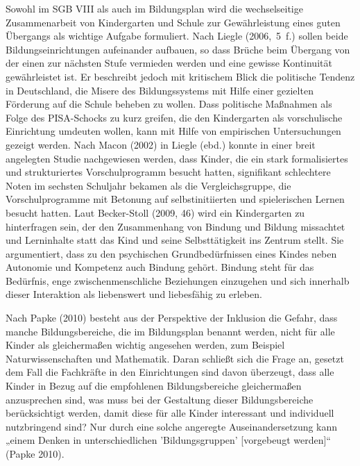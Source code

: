 Sowohl im SGB VIII als auch im Bildungsplan wird die wechselseitige Zusammenarbeit von Kindergarten und Schule zur Gewährleistung eines guten Übergangs als wichtige Aufgabe formuliert. Nach Liegle (2006,~5~f.) sollen beide Bildungseinrichtungen aufeinander aufbauen, so dass Brüche beim Übergang von der einen zur nächsten Stufe vermieden werden und eine gewisse Kontinuität gewährleistet ist. Er beschreibt jedoch mit kritischem Blick die politische Tendenz in Deutschland, die Misere des Bildungssystems mit Hilfe einer gezielten Förderung auf die Schule beheben zu wollen.
Dass politische Maßnahmen als Folge des PISA-Schocks zu kurz greifen, die den Kindergarten als vorschulische Einrichtung umdeuten wollen, kann mit Hilfe von empirischen Untersuchungen gezeigt werden. Nach  Macon (2002) in Liegle (ebd.) konnte in einer breit angelegten Studie nachgewiesen werden, dass Kinder, die ein stark formalisiertes und strukturiertes Vorschulprogramm besucht hatten, signifikant schlechtere Noten im sechsten Schuljahr bekamen als die Vergleichsgruppe, die Vorschulprogramme mit Betonung auf selbstinitiierten und spielerischen Lernen besucht hatten. 
Laut Becker-Stoll (2009, 46) wird ein Kindergarten zu hinterfragen sein, der den Zusammenhang von Bindung und Bildung missachtet und Lerninhalte statt das Kind und seine Selbsttätigkeit ins Zentrum stellt. Sie argumentiert, dass zu den psychischen Grundbedürfnissen eines Kindes neben Autonomie und Kompetenz auch Bindung gehört. Bindung steht für das Bedürfnis, enge zwischenmenschliche Beziehungen einzugehen und sich innerhalb dieser Interaktion als liebenswert und liebesfähig zu erleben. 
 
Nach Papke (2010) besteht aus der Perspektive der Inklusion die Gefahr, dass manche Bildungsbereiche, die im Bildungsplan benannt werden, nicht für alle Kinder als gleichermaßen wichtig angesehen werden, zum Beispiel Naturwissenschaften und Mathematik. Daran schließt sich die Frage an, gesetzt dem Fall die Fachkräfte in den Einrichtungen sind davon überzeugt, dass alle Kinder in Bezug auf die empfohlenen Bildungsbereiche gleichermaßen anzusprechen sind, was muss bei der Gestaltung dieser Bildungsbereiche berücksichtigt werden, damit diese für alle Kinder interessant und individuell nutzbringend sind? Nur durch eine solche angeregte Auseinandersetzung kann „einem Denken in unterschiedlichen 'Bildungsgruppen' [vorgebeugt werden]“ (Papke 2010).
 
